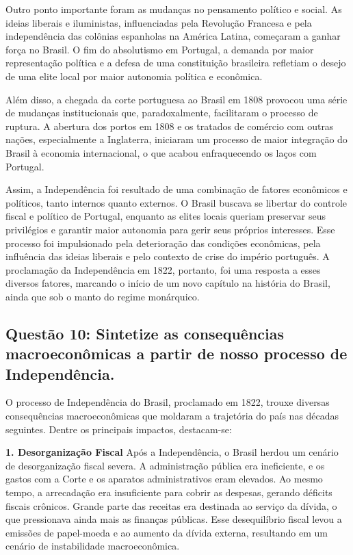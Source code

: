 \documentclass[a4paper,12pt]{article}[abntex2]
\begin{document}
Outro ponto importante foram as mudanças no pensamento político e social. As ideias liberais e iluministas, influenciadas pela Revolução Francesa e pela independência das colônias espanholas na América Latina, começaram a ganhar força no Brasil. O fim do absolutismo em Portugal, a demanda por maior representação política e a defesa de uma constituição brasileira refletiam o desejo de uma elite local por maior autonomia política e econômica.

Além disso, a chegada da corte portuguesa ao Brasil em 1808 provocou uma série de mudanças institucionais que, paradoxalmente, facilitaram o processo de ruptura. A abertura dos portos em 1808 e os tratados de comércio com outras nações, especialmente a Inglaterra, iniciaram um processo de maior integração do Brasil à economia internacional, o que acabou enfraquecendo os laços com Portugal.

Assim, a Independência foi resultado de uma combinação de fatores econômicos e políticos, tanto internos quanto externos. O Brasil buscava se libertar do controle fiscal e político de Portugal, enquanto as elites locais queriam preservar seus privilégios e garantir maior autonomia para gerir seus próprios interesses. Esse processo foi impulsionado pela deterioração das condições econômicas, pela influência das ideias liberais e pelo contexto de crise do império português. A proclamação da Independência em 1822, portanto, foi uma resposta a esses diversos fatores, marcando o início de um novo capítulo na história do Brasil, ainda que sob o manto do regime monárquico.

\subsection{\textbf{Questão 10: Sintetize as consequências macroeconômicas a partir de nosso processo de Independência.}}

O processo de Independência do Brasil, proclamado em 1822, trouxe diversas consequências macroeconômicas que moldaram a trajetória do país nas décadas seguintes. Dentre os principais impactos, destacam-se:

\textbf{1. Desorganização Fiscal}
Após a Independência, o Brasil herdou um cenário de desorganização fiscal severa. A administração pública era ineficiente, e os gastos com a Corte e os aparatos administrativos eram elevados. Ao mesmo tempo, a arrecadação era insuficiente para cobrir as despesas, gerando déficits fiscais crônicos. Grande parte das receitas era destinada ao serviço da dívida, o que pressionava ainda mais as finanças públicas. Esse desequilíbrio fiscal levou a emissões de papel-moeda e ao aumento da dívida externa, resultando em um cenário de instabilidade macroeconômica.
\end{document}
